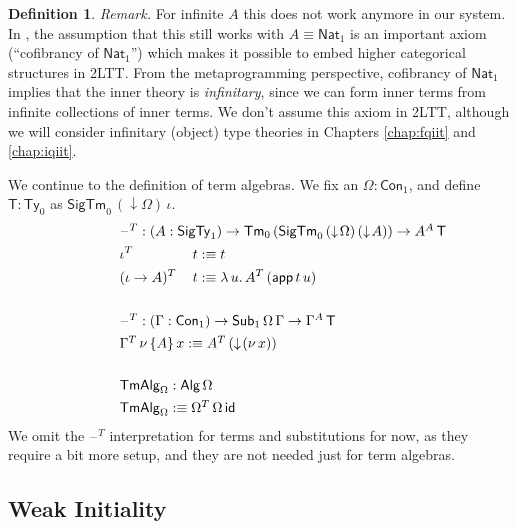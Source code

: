 \documentclass[12pt,a4paper,twoside,openany]{book}
\theoremstyle{remark}
\theoremstyle{definition}
\newtheorem{mydefinition}{Definition}
\theoremstyle{theorem}
\newcommand{\ms}[1]{\mathsf{#1}}
\newcommand{\id}{\mathsf{id}}
\newcommand{\Con}{\mathsf{Con}}
\newcommand{\Sub}{\mathsf{Sub}}
\newcommand{\Tm}{\mathsf{Tm}}
\newcommand{\Ty}{\mathsf{Ty}}
\newcommand{\blank}{\mathord{\hspace{1pt}\text{--}\hspace{1pt}}}
\newcommand{\SigTy}{\mathsf{SigTy}}
\newcommand{\SigTm}{\mathsf{SigTm}}
\newcommand{\app}{\ms{app}}
\newcommand{\Alg}{\ms{Alg}}
\newcommand{\TmAlg}{\ms{TmAlg}}
\newcommand{\Nat}{\ms{Nat}}
\newcommand{\down}{\downarrow}
\newcommand{\defn}{:\equiv}
\begin{document}
\begin{mydefinition}
\emph{Remark.} For infinite $A$ this does not work anymore in our system. In
\cite{twolevel}, the assumption that this still works with $A \equiv \Nat_1$ is
an important axiom (``cofibrancy of $\Nat_1$'') which makes it possible to embed
higher categorical structures in 2LTT. From the metaprogramming perspective,
cofibrancy of $\Nat_1$ implies that the inner theory is \emph{infinitary}, since
we can form inner terms from infinite collections of inner terms. We don't
assume this axiom in 2LTT, although we will consider infinitary (object) type
theories in Chapters \ref{chap:fqiit} and \ref{chap:iqiit}.
\end{mydefinition}

\noindent
We continue to the definition of term algebras. We fix an $\Omega : \Con_1$, and
define $\ms{T} : \Ty_0$ as $\SigTm_0\,(\down\!\Omega)\,\iota$.
\begingroup
\allowdisplaybreaks
\begin{alignat*}{3}
  & \hspace{-5em}\rlap{$\blank^T : (A : \SigTy_1) \to \Tm_0\,(\SigTm_0\,(\down\!\Omega)\,(\down\!A)) \to A^A\,\ms{T}$} \\
  & \hspace{-5em}\iota^T\,&&t \defn t \\
  & \hspace{-5em}(\iota\to A)^T\,&&t \defn \lambda\,u.\,A^T\,(\app\,t\,u)\\
  & \hspace{-5em}&&\\
  & \hspace{-5em}\rlap{$\blank^T : (\Gamma : \Con_1) \to \Sub_1\,\Omega\,\Gamma \to \Gamma^A\,\ms{T}$}\\
  & \hspace{-5em}\rlap{$\Gamma^T\,\nu\,\{A\}\,x \defn A^T\,(\down\!(\nu\,x))$}\\
  & \hspace{-5em} && \\
  & \hspace{-5em}\rlap{$\TmAlg_{\Omega} : \Alg\,\Omega$}\\
  & \hspace{-5em}\rlap{$\TmAlg_{\Omega} \defn \Omega^T\,\Omega\,\id$}
\end{alignat*}
\endgroup
We omit the $\blank^T$ interpretation for terms and substitutions for now, as
they require a bit more setup, and they are not needed just for term algebras.

\subsection{Weak Initiality}
\end{document}
